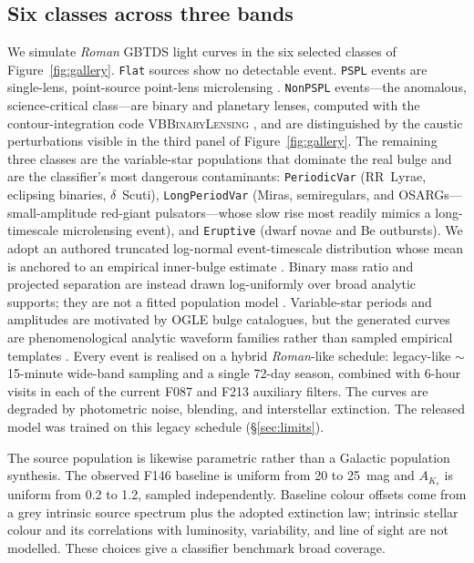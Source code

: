 \documentclass[twocolumn,linenumbers,floatfix,twocolappendix]{aastex701}
\newcommand{\Rom}{\textit{Roman}}
\begin{document}
\subsection{Six classes across three bands}
We simulate \Rom{} GBTDS light curves in the six selected classes of Figure~\ref{fig:gallery}.
\texttt{Flat} sources show no
detectable event. \texttt{PSPL} events are single-lens, point-source point-lens microlensing
\citep{Paczynski1986}. \texttt{NonPSPL} events---the anomalous, science-critical class---are
binary and planetary lenses, computed with the contour-integration code \textsc{VBBinaryLensing}
\citep{Bozza2010,Bozza2018}, and are distinguished by the caustic perturbations visible in the
third panel of Figure~\ref{fig:gallery}. The remaining three classes are the variable-star
populations that dominate the real bulge and are the classifier's most dangerous contaminants:
\texttt{PeriodicVar} (RR~Lyrae, eclipsing binaries, $\delta$~Scuti), \texttt{LongPeriodVar}
(Miras, semiregulars, and OSARGs---small-amplitude red-giant pulsators---whose slow rise most
readily mimics a long-timescale microlensing event), and \texttt{Eruptive} (dwarf novae and Be
outbursts). We adopt an authored truncated log-normal event-timescale distribution whose mean is
anchored to an empirical inner-bulge estimate \citep{Mroz2019}. Binary mass ratio and projected
separation are instead drawn log-uniformly over broad analytic supports; they are not a fitted
population model \citep{Suzuki2016,Zhang2021}. Variable-star periods and amplitudes are motivated
by OGLE bulge catalogues, but the generated curves are phenomenological analytic waveform families
rather than sampled empirical templates \citep{Soszynski2013,Soszynski2014}. Every event is realised
on a hybrid \Rom{}-like schedule: legacy-like $\sim$15-minute wide-band sampling and a single
72-day season, combined with 6-hour visits in each of the current F087 and F213 auxiliary filters.
The curves are degraded by photometric noise, blending, and interstellar extinction. The released
model was trained on this legacy schedule (\S\ref{sec:limits}).

The source population is likewise parametric rather than a Galactic population synthesis. The
observed F146 baseline is uniform from 20 to 25~mag and $A_{K_s}$ is uniform from 0.2 to 1.2,
sampled independently. Baseline colour offsets come from a grey intrinsic source spectrum plus the
adopted extinction law; intrinsic stellar colour and its correlations with luminosity, variability,
and line of sight are not modelled. These choices give a classifier benchmark broad coverage.
\end{document}
